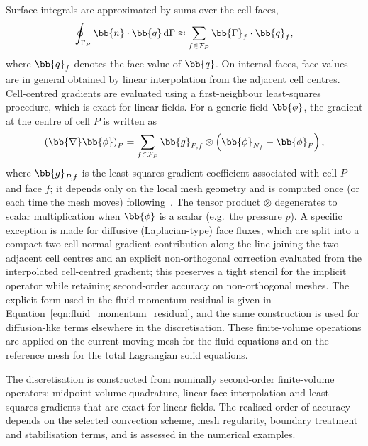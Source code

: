 Surface integrals are approximated by sums over the cell faces,
\begin{equation}
    \oint_{\Gamma_P}
    \bb{n} \cdot \bb{q}
    \, \text{d}\Gamma
    \approx
    \sum_{f \in \mathcal{F}_P}
    \bb{\Gamma}_f \cdot \bb{q}_f ,
    \label{qm:eqn:fv_surface_integral}
\end{equation}
where $\bb{q}_f$ denotes the face value of $\bb{q}$. On internal faces, face values are in general obtained by linear interpolation from the adjacent cell centres.
Cell-centred gradients are evaluated using a first-neighbour least-squares procedure, which is exact for linear fields. For a generic field $\bb{\phi}$, the gradient at the centre of cell $P$ is written as
\begin{equation}
    \left( \bb{\nabla} \bb{\phi} \right)_P
    =
    \sum_{f \in \mathcal{F}_P}
    \bb{g}_{P,f} \otimes \left( \bb{\phi}_{N_f} - \bb{\phi}_{P} \right),
    \label{qm:eqn:least_squares_gradient}
\end{equation}
where $\bb{g}_{P,f}$ is the least-squares gradient coefficient associated with cell $P$ and face $f$; it depends only on the local mesh geometry and is computed once (or each time the mesh moves) following~\citet{Cardiff2026}. The tensor product $\otimes$ degenerates to scalar multiplication when $\bb{\phi}$ is a scalar (e.g.\ the pressure $p$).
A specific exception is made for diffusive (Laplacian-type) face fluxes, which are split into a compact two-cell normal-gradient contribution along the line joining the two adjacent cell centres and an explicit non-orthogonal correction evaluated from the interpolated cell-centred gradient; this preserves a tight stencil for the implicit operator while retaining second-order accuracy on non-orthogonal meshes. The explicit form used in the fluid momentum residual is given in Equation~\eqref{eqn:fluid_momentum_residual}, and the same construction is used for diffusion-like terms elsewhere in the discretisation.
These finite-volume operations are applied on the current moving mesh for the fluid equations and on the reference mesh for the total Lagrangian solid equations.

The discretisation is constructed from nominally second-order finite-volume operators: midpoint volume quadrature, linear face interpolation and
least-squares gradients that are exact for linear fields.
The realised order of accuracy depends on the selected convection scheme, mesh regularity, boundary treatment and stabilisation terms, and is assessed in the numerical examples.

